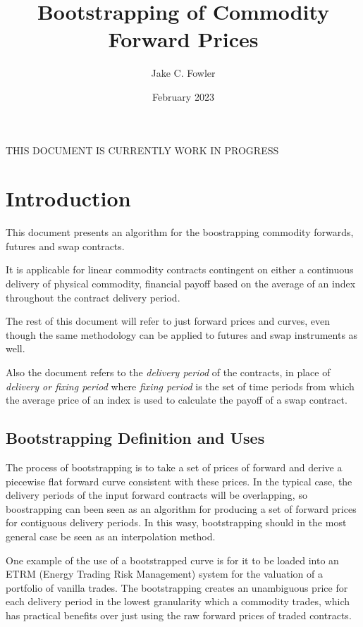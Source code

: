 \documentclass{article}
\title{Bootstrapping of Commodity Forward Prices}
\author{Jake C. Fowler}
\date{February 2023}
\begin{document}
\newcommand{\+}[1]{\ensuremath{\mathbf{#1}}}

\maketitle

THIS DOCUMENT IS CURRENTLY WORK IN PROGRESS

\section{Introduction}
This document presents an algorithm for the boostrapping commodity forwards, futures and swap 
contracts. 


It is applicable for linear commodity contracts contingent on either a continuous delivery
of physical commodity, financial payoff based on the average of an index throughout the
contract delivery period. 

The rest of this document will refer to just forward prices and curves, even though the same 
methodology can be applied to futures and swap instruments as well.

Also the document refers to the \emph{delivery period} of the contracts, in place of 
\emph{delivery or fixing period} where \emph{fixing period} is the set of time periods from 
which the average price of an index is used to calculate the payoff of a swap contract.

\subsection{Bootstrapping Definition and Uses}
The process of bootstrapping is to take a set of prices of forward and derive a piecewise 
flat forward curve consistent with these prices. In the typical case, the delivery periods 
of the input forward contracts will be overlapping, so boostrapping can been seen as an
algorithm for producing a set of forward prices for contiguous delivery periods. 
In this wasy, bootstrapping should in the most general case be seen as an interpolation method.


\bigskip

One example of the use of a bootstrapped curve is for it to be loaded into an ETRM
(Energy Trading Risk Management) system for the valuation of a portfolio of vanilla
trades. The bootstrapping creates an unambiguous price for each delivery period in the
lowest granularity which a commodity trades, which has practical benefits over just
using the raw forward prices of traded contracts.
\end{document}
